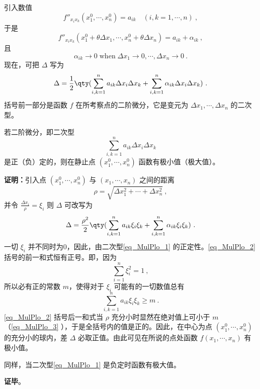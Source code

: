 引入数值
\begin{equation}
f''_{x_ix_k}(x_1^0,\cdots,x_n^0)=a_{ik}\quad (i,k=1,\cdots,n)~,
\end{equation}
于是
\begin{equation}
f''_{x_ix_k}(x_1^0+\theta\Delta x_1,\cdots,x_n^0+\theta\Delta x_n)=a_{ik}+\alpha_{ik}~,
\end{equation}
且
\begin{equation}\label{eq_MulPlo_3}
\alpha_{ik}\rightarrow 0\;\mathrm{when}\;\Delta x_1\rightarrow0,\cdots,\Delta x_n\rightarrow0~.
\end{equation}
现在，可把 $\Delta$ 写为
\begin{equation}
\Delta=\frac{1}{2}\qty(\sum_{i,k=1}^na_{ik}\Delta x_i\Delta x_k+\sum_{i,k=1}^n\alpha_{ik}\Delta x_i\Delta x_k )~.
\end{equation}
括号前一部分是函数 $f$ 在所考察点的二阶微分，它是变元为 $\Delta x_1,\cdots,\Delta x_n$ 的二次型。
\begin{theorem}{}
若二阶微分，即二次型
\begin{equation}\label{eq_MulPlo_1}
\sum_{i,k=1}^na_{ik}\Delta x_i\Delta x_k
\end{equation}
是正（负）定的，则在静止点 $(x_1^0,\cdots,x_n^0)$ 函数有极小值（极大值）。
\end{theorem}
\textbf{证明：}引入点 $(x_1^0,\cdots,x_n^0)$ 与 $(x_1,\cdots,x_n)$ 之间的距离
\begin{equation}
\rho=\sqrt{\Delta x_1^2+\cdots+\Delta x_n^2}~,
\end{equation}
 并令 $\frac{\Delta x_i}{\rho}=\xi_i$
 则 $\Delta$ 可改写为
 \begin{equation}\label{eq_MulPlo_2}
 \Delta=\frac{\rho^2}{2}\qty(\sum_{i,k=1}^na_{ik}\xi_i\xi_k+\sum_{i,k=1}^n\alpha_{ik} \xi_i\xi_k)~.
 \end{equation}
 一切 $\xi_i$ 并不同时为0，因此，由二次型\autoref{eq_MulPlo_1} 的正定性。\autoref{eq_MulPlo_2} 括号的前一和式恒有正号。即，因为
 \begin{equation}
 \sum_{i=1}^n\xi_i^2=1~,
 \end{equation}
 所以必有正的常数 $m$，使得对于 $\xi_i$ 可能有的一切数值总有
 \begin{equation}
 \sum_{i,k=1}^na_{ik}\xi_i\xi_k\geq m~.
 \end{equation}
 \autoref{eq_MulPlo_2} 括号后一和式当 $\rho$ 充分小时显然在绝对值上可小于 $m$（\autoref{eq_MulPlo_3} ），于是全括号内的值是正的。因此，在中心为点 $(x_1^0,\cdots,x_n^0)$ 的充分小的球内，差 $\Delta$ 必取正值。由此可见在所说的点处函数 $f(x_1,\cdots,x_n)$ 有极小值。

 同样，当二次型\autoref{eq_MulPlo_1} 是负定时函数有极大值。

\textbf{证毕}。
